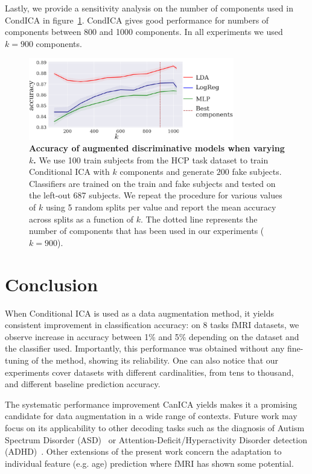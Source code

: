 Lastly, we provide a sensitivity analysis on the number of components used in
CondICA in figure~\ref{condica:sensitivity:fig}.
CondICA gives good performance for numbers of components between 800 and 1000
components. In all experiments we used $k=900$ components.

\begin{figure}
  \centerline{\includegraphics[width=0.8\textwidth]{figures/condica/sensitivity.pdf}}
  \caption{\textbf{Accuracy of augmented discriminative models when
      varying $k$.} We use 100 train subjects from the HCP task dataset to train Conditional ICA with $k$ components and generate $200$ fake subjects.
    Classifiers are trained on the train and fake subjects and tested on the
    left-out 687 subjects. We repeat the procedure
    for various values of $k$ using 5 random splits per value and
    report the mean accuracy across splits as a function of $k$.
    The dotted line represents the number of components that has been
    used in our experiments ($k=900$).
  }
  \label{condica:sensitivity:fig}
\end{figure}






\section{Conclusion}
When Conditional ICA is used as a data augmentation method, it yields consistent
improvement in classification accuracy: on 8 tasks fMRI datasets, we observe
increase in accuracy between 1\% and 5\% depending on the dataset and the
classifier used.
Importantly, this performance was obtained without any fine-tuning of
the method, showing its reliability. One can also notice that our experiments cover datasets with different cardinalities, from tens to thousand, and different baseline prediction accuracy.

The systematic performance improvement CanICA yields
makes it a promising candidate for data augmentation in a wide range of
contexts. Future work may focus on its applicability to other decoding tasks
such as the diagnosis of Autism Spectrum Disorder
(ASD)~\cite{eslami2019asd,eslami2019auto,dvornek2017identifying} or
Attention-Deficit/Hyperactivity Disorder detection (ADHD)~\cite{mao2019spatio}. Other extensions of the present work concern the adaptation to
individual feature (e.g. age) prediction where
fMRI has shown some potential.
%
